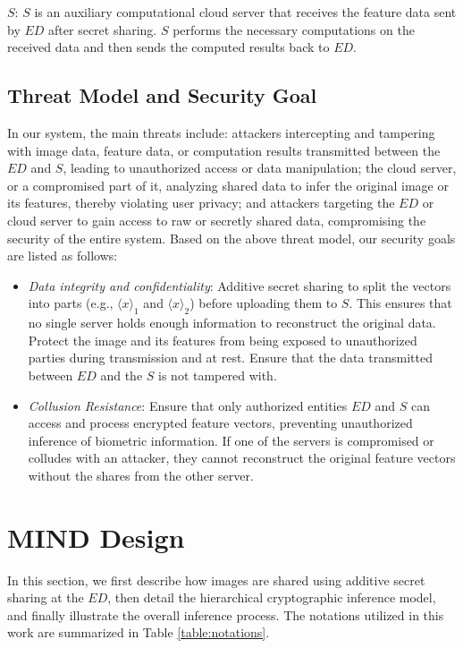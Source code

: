 \documentclass[conference]{IEEEtran}
\begin{document}
$S$: $S$ is an auxiliary computational cloud server that receives the feature data sent by $ED$ after secret sharing. $S$ performs the necessary computations on the received data and then sends the computed results back to $ED$. 
 

\subsection{Threat Model and Security Goal}
In our system, the main threats include: attackers intercepting and tampering with image data, feature data, or computation results transmitted between the $ED$ and $S$, leading to unauthorized access or data manipulation; the cloud server, or a compromised part of it, analyzing shared data to infer the original image or its features, thereby violating user privacy; and attackers targeting the $ED$ or cloud server to gain access to raw or secretly shared data, compromising the security of the entire system. Based on the above threat model, our security goals are listed as follows:
\begin{itemize}
     \item \textit{Data integrity and confidentiality}: Additive secret sharing to split the vectors into parts (e.g., $\langle x \rangle_1$ and $\langle x \rangle_2$) before uploading them to $S$. This ensures that no single server holds enough information to reconstruct the original data. Protect the image and its features from being exposed to unauthorized parties during transmission and at rest. Ensure that the data transmitted between $ED$ and the $S$ is not tampered with. 
     \item \textit{Collusion Resistance}: Ensure that only authorized entities $ED$ and $S$ can access and process encrypted feature vectors, preventing unauthorized inference of biometric information. If one of the servers is compromised or colludes with an attacker, they cannot reconstruct the original feature vectors without the shares from the other server.
 \end{itemize}
 
\section{MIND Design}
In this section, we first describe how images are shared using additive secret sharing at the $ED$, then detail the hierarchical cryptographic inference model, and finally illustrate the overall inference process. The notations utilized in this work are summarized in Table \ref{table:notations}.
\end{document}
